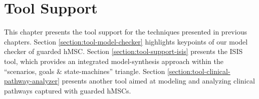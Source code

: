 \chapter{Tool Support\label{chapter:tool-support}}

This chapter presents the tool support for the techniques presented in previous chapters. Section \ref{section:tool-model-checker} highlights keypoints of our model checker of guarded hMSC. Section \ref{section:tool-support-isis} presents the ISIS tool, which provides an integrated model-synthesis approach within the ``scenarios, goals $\&$ state-machines'' triangle. Section \ref{section:tool-clinical-pathway-analyzer} presents another tool aimed at modeling and analyzing clinical pathways captured with guarded hMSCs.





